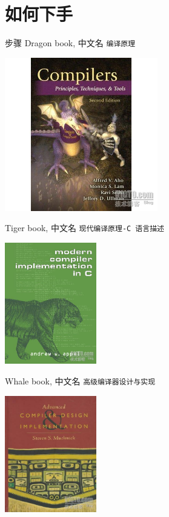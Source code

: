 \documentclass[presentation, bigger]{beamer}
\begin{document}
\section{如何下手}
\label{sec:orgdf880a7}
\begin{frame}[fragile,allowframebreaks,label=]{步骤}
 \alert{Dragon book}, 中文名 \texttt{编译原理}
\begin{center}
\includegraphics[width=0.5\textwidth]{./img/dragon.jpg}
\end{center}

\framebreak
\alert{Tiger book}, 中文名 \texttt{现代编译原理-C 语言描述}
\begin{center}
\includegraphics[width=0.3\textwidth]{./img/tiger.jpg}
\end{center}

\framebreak

\alert{Whale book}, 中文名 \texttt{高级编译器设计与实现}
\begin{center}
\includegraphics[width=0.3\textwidth]{./img/whale.jpg}
\end{center}
\end{frame}
\end{document}
